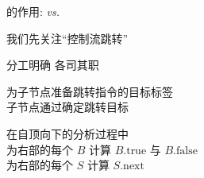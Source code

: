
\begin{frame}
  \begin{center}

    \vspace{0.50cm}
  \end{center}
\end{frame}

\begin{frame}{}
  \begin{center}
    {\Large {}的作用:  \emph{vs.} }

    \vspace{0.50cm}

    \vspace{0.30cm}
    {\large 我们先关注``控制流跳转''}
  \end{center}
\end{frame}

\begin{frame}
  \begin{center}

  \end{center}
\end{frame}

\begin{frame}{}
  \begin{center}
    {\Large 分工明确 \qquad 各司其职}

    \vspace{0.30cm}
  \end{center}

  \pause
  \vspace{0.30cm}
  \begin{center}
    为子节点准备跳转指令的目标标签 \\[5pt]
    子节点通过确定跳转目标
  \end{center}
\end{frame}

\begin{frame}{}
  \begin{center}
    在自顶向下的分析过程中 \\[15pt]

    为右部的每个 $B$ 计算 $B.\text{true}$ 与 $B.\text{false}$ \\[10pt]
    为右部的每个 $S$ 计算 $S.\text{next}$
  \end{center}
\end{frame}

